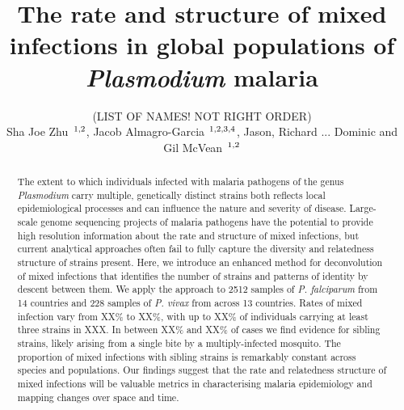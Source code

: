 \documentclass{article}
\newcounter{todocounter}
\newcommand{\done}[2][]
{\todo[color=green!40, #1]{#2}}
\newcommand{\donenum}[2][]
{\stepcounter{todocounter}\done[#1]{\thetodocounter: #2}}
\begin{document}
\title{The rate and structure of mixed infections in global populations of {\it Plasmodium} malaria}
\date{}

\author{(LIST OF NAMES! NOT RIGHT ORDER)\\
Sha Joe Zhu\,$^{\text{ 1,\textcolor{black}{2}}}$, Jacob Almagro-Garcia\,$^{\text{ 1,\textcolor{black}{2},3,4}}$, Jason, Richard ... Dominic and Gil McVean\,$^{\text{ 1,\textcolor{black}{2}}}$}


\maketitle
{}
\listoftodos
{}




\begin{abstract}
The extent to which individuals infected with malaria pathogens of the genus {\it Plasmodium} carry multiple, genetically distinct strains both reflects local epidemiological processes and can influence the nature and severity of disease.  Large-scale genome sequencing projects of malaria pathogens have the potential to provide high resolution information about the rate and structure of mixed infections, but current analytical approaches often fail to fully capture the diversity and relatedness structure of strains present.  Here, we introduce an enhanced method for deconvolution of mixed infections that identifies the number of strains and patterns of identity by descent between them.  We apply the approach to 2512 samples of {\it P. falciparum} from 14 countries and 228 samples of {\it P. vivax} from across 13 countries.
Rates of mixed infection vary from XX\% to XX\%, with up to XX\% of individuals carrying at least three strains in XXX.  In between XX\% and XX\% of cases we find evidence for sibling strains, likely arising from a single bite by a multiply-infected mosquito.  The proportion of mixed infections with sibling strains is remarkably constant across species and populations.  Our findings suggest that the rate and relatedness structure of mixed infections will be valuable metrics in characterising malaria epidemiology and mapping changes over space and time.
\end{abstract}
\end{document}
